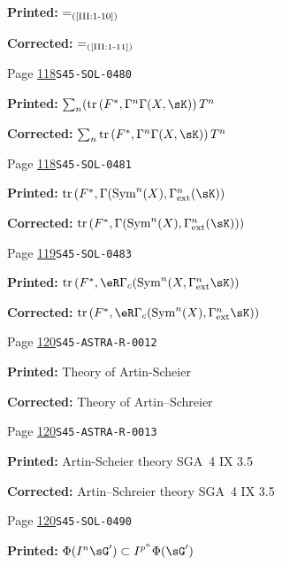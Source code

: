 \documentclass[oneside]{book}
\makeatletter
\DeclareMathOperator{\tr}{tr}
\theoremstyle{sga-source}
\theoremstyle{sga-source-dash}
\theoremstyle{sga-source-dotdash}
\theoremstyle{sga-source-number-note-dash}
\theoremstyle{sga-source-note-number-dotdash}
\theoremstyle{sga-source-example-dotdash}
\theoremstyle{sga-source-inline-number}
\theoremstyle{sga-source-bare-number}
\theoremstyle{sga-source}
\newcommand{\EditionRememberCite}[2][]{%
  \if@filesw\immediate\write\@auxout{\string\citation{#2}}\fi}
\DeclareRobustCommand{\PrintCite}[2]{%
  \begingroup\let\cite\EditionRememberCite
    \setbox\z@=\hbox{#2}%
  \endgroup#1}
\def\PrintCite#1#2{#1}%
\makeatother
\begin{document}
\begin{description}
\par\noindent\textbf{Printed:} \(=_{\text{(\ref{III:1-10})}}\)
\par\noindent\textbf{Corrected:} \(=_{\text{(\ref{III:1-11})}}\)
\smallskip
\item[\hypertarget{apparatus:EN-0051}{51}] Page \hyperlink{printpage:en:118}{118}\quad\texttt{S45-SOL-0480}
\par\noindent\textbf{Printed:} \(\sum_n (\tr\left(F^*,\Gamma^n \Gamma(X,\sK)\right) T^n\)
\par\noindent\textbf{Corrected:} \(\sum_n \tr\left(F^*,\Gamma^n \Gamma(X,\sK)\right) T^n\)
\smallskip
\item[\hypertarget{apparatus:EN-0052}{52}] Page \hyperlink{printpage:en:118}{118}\quad\texttt{S45-SOL-0481}
\par\noindent\textbf{Printed:} \(\tr\left(F^*,\Gamma(\operatorname{Sym}^n(X),\Gamma_\text{ext}^n(\sK)\right)\)
\par\noindent\textbf{Corrected:} \(\tr\left(F^*,\Gamma(\operatorname{Sym}^n(X),\Gamma_\text{ext}^n(\sK))\right)\)
\smallskip
\item[\hypertarget{apparatus:EN-0053}{53}] Page \hyperlink{printpage:en:119}{119}\quad\texttt{S45-SOL-0483}
\par\noindent\textbf{Printed:} \(\tr\left(F^*,\eR\Gamma_c(\operatorname{Sym}^n(X,\Gamma_\text{ext}^n \sK)\right)\)
\par\noindent\textbf{Corrected:} \(\tr\left(F^*,\eR\Gamma_c(\operatorname{Sym}^n(X),\Gamma_\text{ext}^n \sK)\right)\)
\smallskip
\item[\hypertarget{apparatus:EN-0054}{54}] Page \hyperlink{printpage:en:120}{120}\quad\texttt{S45-ASTRA-R-0012}
\par\noindent\textbf{Printed:} Theory of Artin-Scheier
\par\noindent\textbf{Corrected:} Theory of Artin--Schreier
\smallskip
\item[\hypertarget{apparatus:EN-0055}{55}] Page \hyperlink{printpage:en:120}{120}\quad\texttt{S45-ASTRA-R-0013}
\par\noindent\textbf{Printed:} Artin-Scheier theory \PrintCite{SGA~4 IX 3.5}{\cite[IX 3.5]{sga4}}
\par\noindent\textbf{Corrected:} Artin--Schreier theory \PrintCite{SGA~4 IX 3.5}{\cite[IX 3.5]{sga4}}
\smallskip
\item[\hypertarget{apparatus:EN-0056}{56}] Page \hyperlink{printpage:en:120}{120}\quad\texttt{S45-SOL-0490}
\par\noindent\textbf{Printed:} \(\Phi(I^n \sG')\subset I^{p^n}\Phi(\sG')\)

\end{description}
\end{document}
